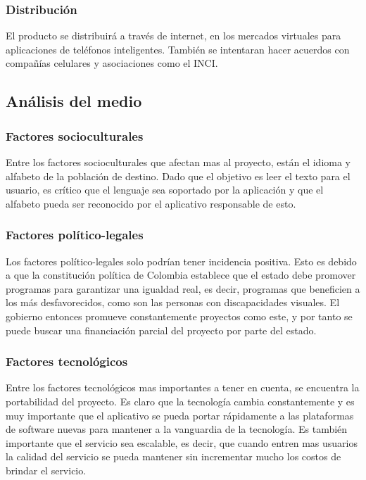 \documentclass[a4paper, 12pt, oneside]{article}
\begin{document}
	\subsubsection{Distribución}
	El producto se distribuirá a través de internet, en los mercados virtuales para aplicaciones de teléfonos inteligentes. También se intentaran hacer acuerdos con compañías celulares y
	asociaciones como el INCI.

	\subsection{Análisis del medio}

	\subsubsection{Factores socioculturales}
	Entre los factores socioculturales que afectan mas al proyecto, están el idioma y alfabeto de la población de destino. Dado que el objetivo es leer el texto para el usuario, es crítico que el lenguaje sea soportado por la aplicación y que el alfabeto pueda ser reconocido por el aplicativo responsable de esto.
	
	\subsubsection{Factores político-legales}
	Los factores político-legales solo podrían tener incidencia positiva. Esto es debido a que la constitución política de Colombia establece que el estado debe promover programas para
	garantizar una igualdad real, es decir, programas que beneficien a los más desfavorecidos, como son las personas con discapacidades visuales. El gobierno entonces promueve
	constantemente proyectos como este, y por tanto se puede buscar una financiación parcial del proyecto por parte del estado.
	
	\subsubsection{Factores tecnológicos}
	Entre los factores tecnológicos mas importantes a tener en cuenta, se encuentra la portabilidad del proyecto. Es claro que la tecnología cambia constantemente y es muy importante que el aplicativo se pueda portar rápidamente a las plataformas de software nuevas para mantener a la vanguardia de la tecnología. Es también importante que el servicio sea escalable, es decir, que cuando entren mas usuarios la calidad del servicio se pueda mantener sin incrementar mucho los costos de brindar el servicio.
	
\end{document}
